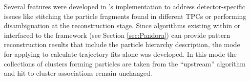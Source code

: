 Several features were developed in 's  implementation to address detector-specific issues like stitching the particle fragments found in different TPCs or %
performing disambiguation at the \threed reconstruction stage. Since algorithms existing within or interfaced to the  framework (see Section \ref{sec:Pandora}) can provide pattern reconstruction results that include the particle hierarchy description, the mode for applying  to calculate %
trajectory fits alone was developed. In this mode the collections of clusters forming particles are taken from the ``upstream'' algorithm and  hit-to-cluster associations remain unchanged. %


